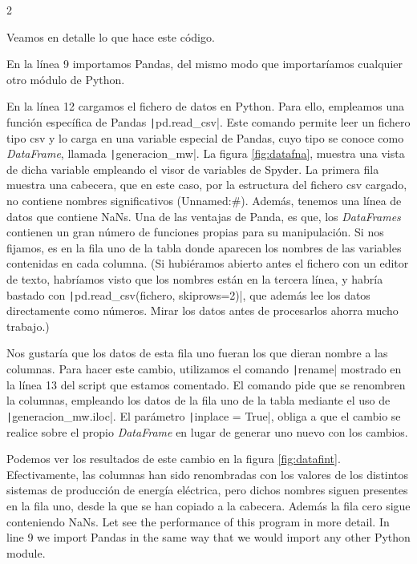 \begin{paracol}{2}
 	
Veamos en detalle lo que hace este código.

En la línea 9 importamos Pandas, del mismo modo que importaríamos cualquier otro módulo de Python. 

En la línea 12 cargamos el fichero de datos en Python. Para ello, empleamos una función específica de Pandas \texttt|pd.read_csv|. Este comando permite leer un fichero tipo csv y lo carga en una variable especial de Pandas, cuyo tipo se conoce como \emph{DataFrame}, llamada \texttt|generacion_mw|. La figura \ref{fig:datafna}, muestra una vista de dicha variable empleando el visor de variables de Spyder. La primera fila muestra una cabecera, que en este caso, por la estructura del fichero csv cargado, no contiene nombres significativos (Unnamed:\#). Además, tenemos una línea de datos que contiene NaNs. Una de las ventajas de Panda, es que, los \emph{DataFrames} contienen un gran número de funciones propias para su manipulación. Si nos fijamos, es en la fila uno de la tabla donde aparecen los nombres de las variables contenidas en cada columna. (Si hubiéramos abierto antes el fichero con un editor de texto, habríamos visto que los nombres están en la tercera línea, y habría bastado con \texttt|pd.read_csv(fichero, skiprows=2)|, que además lee los datos directamente como números. Mirar los datos antes de procesarlos ahorra mucho trabajo.)

Nos gustaría que los datos de esta fila uno fueran los que dieran nombre a las columnas. Para hacer este cambio, utilizamos el comando \texttt|rename| mostrado en la línea 13 del script que estamos comentado. El comando pide que se renombren la columnas, empleando los datos de la fila uno de la tabla mediante el uso de \texttt|generacion_mw.iloc|. El parámetro \texttt|inplace = True|, obliga a que el cambio se realice sobre el propio \emph{DataFrame} en lugar de generar uno nuevo con los cambios.

Podemos ver los resultados de este cambio en la figura \ref{fig:datafint}. Efectivamente, las columnas han sido renombradas con los valores de los distintos sistemas de producción de energía eléctrica, pero dichos nombres siguen presentes en la fila uno, desde la que se han copiado a la cabecera. Además la fila cero sigue conteniendo NaNs.
\switchcolumn
Let see the performance of this program in more detail.
In line 9 we import Pandas in the same way that we would import any other Python module.


\end{paracol}
